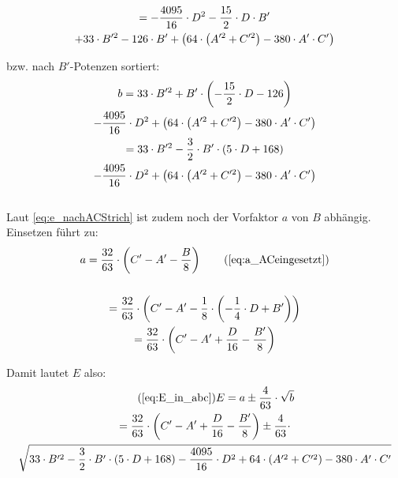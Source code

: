 \documentclass[12pt,a4paper]{article}
\begin{document}
\begin{gather}
= -\frac{4095}{16} \cdot D^2 
- \frac{15}{2} \cdot D\cdot B'  
\\ \notag
+ 33\cdot B'^2 
-126 \cdot B' 
+ \left( 64 \cdot  \left(A'^2 + C'^2\right) - 380\cdot A' \cdot C' \right) 
\end{gather}

  
bzw. nach $B'$-Potenzen sortiert: 
\begin{gather}
b = 
 33\cdot B'^2 
 + B' \cdot \left( 
 - \frac{15}{2} \cdot D-126
 \right) \\ \notag
-\frac{4095}{16} \cdot D^2 
+ \left( 64 \cdot  \left(A'^2 + C'^2\right) - 380\cdot A' \cdot C' \right) \\
= 
 33\cdot B'^2 
 - \frac{3}{2} \cdot B' \cdot \left( 
 5 \cdot D + 168
 \right) \\ \notag
-\frac{4095}{16} \cdot D^2 
+ \left( 64 \cdot  \left(A'^2 + C'^2\right) - 380\cdot A' \cdot C' \right)
\end{gather} \\
  
  
Laut \eqref{eq:e_nachACStrich} ist zudem noch der Vorfaktor $a$ von $B$ abhängig. Einsetzen führt zu:
\begin{gather}
 a = \frac{32}{63}\cdot \left( C' - A' 
- \frac{B}{8}\right) 
\tag{\ref{eq:a_ACeingesetzt}} \\ \notag \\
 = \frac{32}{63}\cdot \left( C' - A' 
- \frac{1}{8} \cdot \left( - \frac{1}{4} \cdot D + B' \right) 
\right)  \\
 = \frac{32}{63}\cdot \left( C' - A'  + \frac{D}{16} - \frac{B'}{8}
 \right)
\end{gather}

Damit lautet $E$ also: 
\begin{gather}
\tag{\ref{eq:E_in_abc}}
E = a \pm \frac{4}{63} \cdot \sqrt{b} 
\\ 
= \frac{32}{63}\cdot \left( C' - A'  + \frac{D}{16} - \frac{B'}{8}
 \right) 
 \pm \frac{4}{63}  \cdot \\ \notag 
 \sqrt{ 33\cdot B'^2 
 - \frac{3}{2} \cdot B' \cdot \left( 
 5 \cdot D + 168
 \right)
-\frac{4095}{16} \cdot D^2 
+ 64 \cdot  \left(A'^2 + C'^2\right) - 380\cdot A' \cdot C' }
\end{gather}





\begin{gather}
\end{gather}

  
  
  
  
  
  
  
  
  
  
  
  
\end{document}
